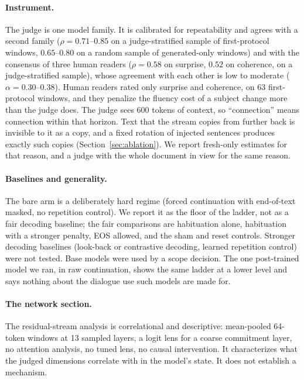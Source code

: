 \paragraph{Instrument.} The judge is one model family. It is calibrated for
repeatability and agrees with a second family ($\rho=0.71$--$0.85$ on a
judge-stratified sample of first-protocol windows, $0.65$--$0.80$ on a random
sample of generated-only windows) and with the consensus of three human
readers ($\rho=0.58$ on surprise, $0.52$ on coherence, on a judge-stratified
sample), whose agreement with each other is low to moderate
($\alpha=0.30$--$0.38$). Human readers rated only surprise and coherence, on
63 first-protocol windows, and they penalize the fluency cost of a subject
change more than the judge does. The judge sees 600 tokens of
context, so ``connection'' means connection within that horizon. Text that
the stream copies from further back is invisible to it as a copy, and a
fixed rotation of injected sentences produces exactly such copies
(Section~\ref{sec:ablation}). We report fresh-only estimates for that
reason, and a judge with the whole document in view for the same reason.

\paragraph{Baselines and generality.} The bare arm is a deliberately hard
regime (forced continuation with end-of-text masked, no repetition control).
We report it as the floor of the ladder, not as a fair decoding baseline; the
fair comparisons are habituation alone, habituation with a stronger penalty,
EOS allowed, and the sham and reset controls. Stronger decoding baselines
(look-back or contrastive decoding, learned repetition control) were not
tested. Base models were used by a scope decision. The one post-trained
model we ran, in raw continuation, shows the same ladder at a lower level
and says nothing about the dialogue use such models are made for.

\paragraph{The network section.} The residual-stream analysis is
correlational and descriptive: mean-pooled 64-token windows at 13 sampled
layers, a logit lens for a coarse commitment layer, no attention analysis,
no tuned lens, no causal intervention. It characterizes what the judged
dimensions correlate with in the model's state. It does not establish a
mechanism.
